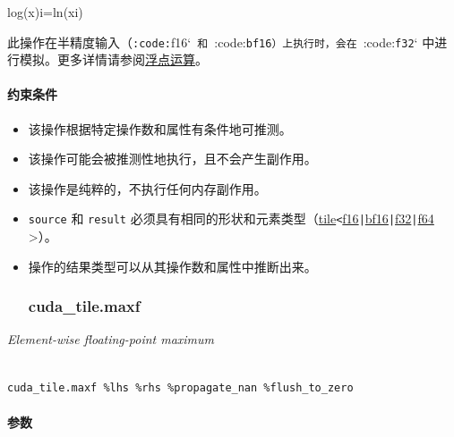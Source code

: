 \documentclass{article}
\begin{document}
log(x)i=ln(xi)


此操作在半精度输入（\texttt{:code:}f16`\texttt{ 和 }:code:\texttt{bf16}\texttt{）上执行时，会在 }:code:\texttt{f32}` 中进行模拟。更多详情请参阅\href{https://docs.nvidia.com/cuda/tile-ir/latest/sections/operations.html#op-group-floating-point}{浮点运算}。





\paragraph{约束条件}


\begin{itemize}
\item 该操作根据特定操作数和属性有条件地可推测。
\item 该操作可能会被推测性地执行，且不会产生副作用。
\item 该操作是纯粹的，不执行任何内存副作用。
\item \texttt{source} 和 \texttt{result} 必须具有相同的形状和元素类型（\href{https://docs.nvidia.com/cuda/tile-ir/latest/sections/types.html#type-tile}{tile}\texttt{<}\href{https://docs.nvidia.com/cuda/tile-ir/latest/sections/types.html#subsection-element-types}{f16}\texttt{|}\href{https://docs.nvidia.com/cuda/tile-ir/latest/sections/types.html#subsection-element-types}{bf16}\texttt{|}\href{https://docs.nvidia.com/cuda/tile-ir/latest/sections/types.html#subsection-element-types}{f32}\texttt{|}\href{https://docs.nvidia.com/cuda/tile-ir/latest/sections/types.html#subsection-element-types}{f64} >）。
\item 操作的结果类型可以从其操作数和属性中推断出来。




\subsubsection{cuda\_tile.maxf}


\end{itemize}
\textit{Element-wise floating-point maximum}




\begin{lstlisting}

cuda_tile.maxf %lhs %rhs %propagate_nan %flush_to_zero

\end{lstlisting}



\paragraph{参数}
\end{document}
